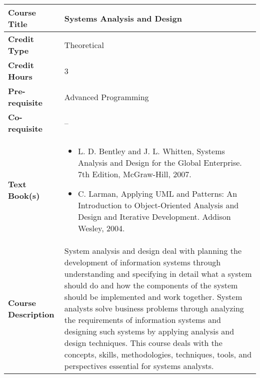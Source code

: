 \documentclass[11pt]{article}
\begin{document}
\begin{table}[h!]
\begin{tabular}{|l|l|}
\hline
\textbf{Course Title}       &  Systems Analysis and Design \\ \hline
\textbf{Credit Type}        &  Theoretical \\ \hline
\textbf{Credit Hours}       & 3 \\ \hline
\textbf{Pre-requisite}       &  Advanced Programming \\ \hline
\textbf{Co-requisite}       &  -- \\ \hline
\textbf{Text Book(s)}       & \begin{minipage}{.70\textwidth}
\begin{itemize} \itemsep-0.4em
	\vspace{3mm}
	\item L. D. Bentley and J. L. Whitten, Systems Analysis and Design for the Global Enterprise. 7th Edition, McGraw-Hill, 2007.
	\item C. Larman, Applying UML and Patterns: An Introduction to Object-Oriented Analysis and Design and Iterative Development. Addison Wesley, 2004.
	\vspace{3mm}
\end{itemize}
\end{minipage}\\ \hline
\textbf{Course Description} & \begin{minipage}{.70\textwidth}
\vspace{3mm}
System analysis and design deal with planning the development of information systems through understanding and specifying in detail what a system should do and how the components of the system should be implemented and work together. System analysts solve business problems through analyzing the requirements of information systems and designing such systems by applying analysis and design techniques. This course deals with the concepts, skills, methodologies, techniques, tools, and perspectives essential for systems analysts.
\vspace{3mm}
\end{minipage} \\ \hline
\end{tabular}
\end{table}
\end{document}
